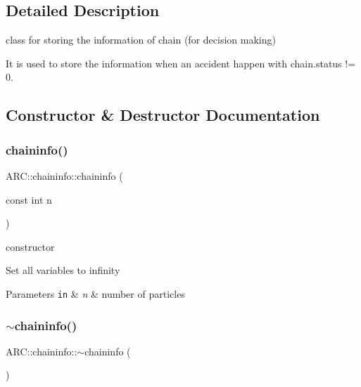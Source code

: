 \subsection{Detailed Description}
class for storing the information of chain (for decision making) 

It is used to store the information when an accident happen with chain.\+status != 0. 

\subsection{Constructor \& Destructor Documentation}
\hypertarget{classARC_1_1chaininfo_a443631a28e2cd66512683df4669088eb}{}\label{classARC_1_1chaininfo_a443631a28e2cd66512683df4669088eb} 
\subsubsection{\texorpdfstring{chaininfo()}{chaininfo()}}
{\footnotesize\ttfamily A\+R\+C\+::chaininfo\+::chaininfo (\begin{DoxyParamCaption}\item[{const int}]{n }\end{DoxyParamCaption})\hspace{0.3cm}{\ttfamily [inline]}}



constructor 

Set all variables to infinity 
\begin{DoxyParams}[1]{Parameters}
\mbox{\tt in}  & {\em n} & number of particles \\
\hline
\end{DoxyParams}
\hypertarget{classARC_1_1chaininfo_aca51a64943e31e1ac33473fb90c39a17}{}\label{classARC_1_1chaininfo_aca51a64943e31e1ac33473fb90c39a17} 
\subsubsection{\texorpdfstring{$\sim$chaininfo()}{~chaininfo()}}
{\footnotesize\ttfamily A\+R\+C\+::chaininfo\+::$\sim$chaininfo (\begin{DoxyParamCaption}{ }\end{DoxyParamCaption})\hspace{0.3cm}{\ttfamily [inline]}}



